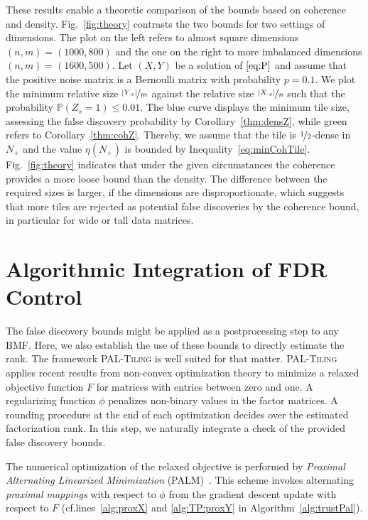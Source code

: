 These results enable a theoretic comparison of the bounds based on coherence and density. Fig.~\ref{fig:theory} contrasts the two bounds for two settings of dimensions. The plot on the left refers to almost square dimensions $(n,m)=(1000,800)$ and the one on the right to more imbalanced dimensions $(n,m)=(1600,500)$. Let $(X,Y)$ be a solution of $\eqref{eq:P}$ and assume that the positive noise matrix is a Bernoulli matrix with probability $p=0.1$. We plot the minimum relative size $\nicefrac{|Y_{\cdot s}|}{m}$ against the relative size $\nicefrac{|X_{\cdot s}|}{n}$ such that the probability $\mathbb{P}(Z_s=1)\leq 0.01$. The blue curve displays the minimum tile size, assessing the false discovery probability by Corollary~\ref{thm:densZ}, while green refers to Corollary~\ref{thm:cohZ}. Thereby, we assume that the tile is $\nicefrac{1}{2}$-dense in $N_+$ and the value $\eta(N_+)$ is bounded by Inequality~\eqref{eq:minCohTile}. Fig.~\ref{fig:theory} indicates that under the given circumstances the coherence provides a more loose bound than the density. The difference between the required sizes is larger, if the dimensions are disproportionate, which suggests that more tiles are rejected as potential false discoveries by the coherence bound, in particular for wide or tall data matrices.     
\section{Algorithmic Integration of FDR Control}\label{sec:TP:algorithmicIntegration}
The false discovery bounds might be applied as a postprocessing step to any BMF. Here, we also establish the use of these bounds to directly estimate the rank.
The framework \textsc{PAL-Tiling} is well suited for that matter. \textsc{PAL-Tiling} applies recent results from non-convex optimization theory to minimize a relaxed objective function $F$ for matrices with entries between zero and one. A regularizing function $\phi$ penalizes non-binary values in the factor matrices. A rounding procedure at the end of each optimization decides over the estimated factorization rank. In this step, we naturally integrate a check of the provided false discovery bounds. 

The numerical optimization of the relaxed objective is performed by \emph{Proximal Alternating Linearized Minimization} (PALM)~\cite{bolte2014proximal}. This scheme invokes alternating \emph{proximal mappings} with respect to $\phi$ from the gradient descent update with respect to $F$ (cf.\@ lines~\ref{alg:proxX} and \ref{alg:TP:proxY} in Algorithm~\ref{alg:trustPal}).
 
